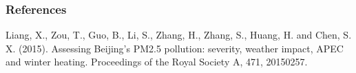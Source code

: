 \documentclass[]{article}
\begin{document}
\hypertarget{references}{%
\subsubsection{References}\label{references}}

Liang, X., Zou, T., Guo, B., Li, S., Zhang, H., Zhang, S., Huang, H. and
Chen, S. X. (2015). Assessing Beijing's PM2.5 pollution: severity,
weather impact, APEC and winter heating. Proceedings of the Royal
Society A, 471, 20150257.
\end{document}
